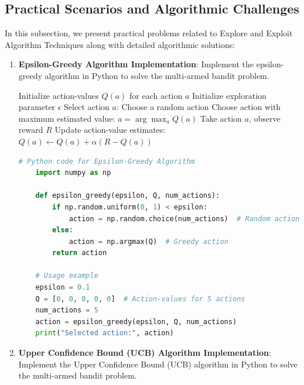 \documentclass[12pt]{book} %
\begin{document}
\subsection{Practical Scenarios and Algorithmic Challenges}
In this subsection, we present practical problems related to Explore and Exploit Algorithm Techniques along with detailed algorithmic solutions:

\begin{enumerate}
    \item \textbf{Epsilon-Greedy Algorithm Implementation}: Implement the epsilon-greedy algorithm in Python to solve the multi-armed bandit problem.
    
    \begin{algorithm}[H]
    \caption{Epsilon-Greedy Algorithm}
    \begin{algorithmic}[1]
    \State Initialize action-values $Q(a)$ for each action $a$
    \State Initialize exploration parameter $\epsilon$
        \State Select action $a$:
            \State Choose a random action
        \Else
            \State Choose action with maximum estimated value: $a = \arg\max_a Q(a)$
        \EndIf
        \State Take action $a$, observe reward $R$
        \State Update action-value estimates: $Q(a) \leftarrow Q(a) + \alpha(R - Q(a))$
    \EndFor
    \end{algorithmic}
    \end{algorithm}
    
    \FloatBarrier
    \begin{lstlisting}[language=Python, caption=Epsilon-Greedy Algorithm Implementation]
    # Python code for Epsilon-Greedy Algorithm
    import numpy as np
    
    def epsilon_greedy(epsilon, Q, num_actions):
        if np.random.uniform(0, 1) < epsilon:
            action = np.random.choice(num_actions)  # Random action
        else:
            action = np.argmax(Q)  # Greedy action
        return action
    
    # Usage example
    epsilon = 0.1
    Q = [0, 0, 0, 0, 0]  # Action-values for 5 actions
    num_actions = 5
    action = epsilon_greedy(epsilon, Q, num_actions)
    print("Selected action:", action)
    \end{lstlisting}
    \FloatBarrier
    
    \item \textbf{Upper Confidence Bound (UCB) Algorithm Implementation}: Implement the Upper Confidence Bound (UCB) algorithm in Python to solve the multi-armed bandit problem.
    

\end{enumerate}
\end{document}
